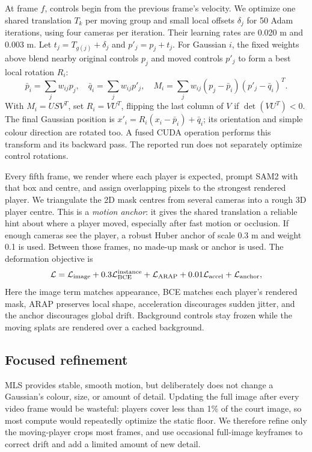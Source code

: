 \documentclass[11pt]{article}
\begin{document}
At frame $f$, controls begin from the previous frame's velocity. We optimize one shared translation
$T_k$ per moving group and small local offsets $\delta_j$ for 50 Adam iterations, using four
cameras per iteration. Their learning rates are 0.020 m and 0.003 m. Let
$t_j=T_{g(j)}+\delta_j$ and $p'_j=p_j+t_j$. For Gaussian $i$, the fixed weights above blend nearby
original controls $p_j$ and moved controls $p'_j$ to form a best local rotation $R_i$:
\[
 \bar p_i=\sum_jw_{ij}p_j,\quad \bar q_i=\sum_jw_{ij}p'_j,\quad
 M_i=\sum_jw_{ij}(p_j-\bar p_i)(p'_j-\bar q_i)^T.
\]
With $M_i=USV^T$, set $R_i=VU^T$, flipping the last column of $V$ if $\det(VU^T)<0$. The final
Gaussian position is $x'_i=R_i(x_i-\bar p_i)+\bar q_i$; its orientation and simple colour direction
are rotated too. A fused CUDA operation performs this transform and its backward pass. The reported
run does not separately optimize control rotations.

Every fifth frame, we render where each player is expected, prompt SAM2 with that box and centre,
and assign overlapping pixels to the strongest rendered player. We triangulate the 2D mask centres
from several cameras into a rough 3D player centre. This is a \emph{motion anchor}: it gives the
shared translation a reliable hint about where a player moved, especially after fast motion or
occlusion. If enough cameras see the player, a robust Huber anchor of scale 0.3 m and weight 0.1
is used. Between those frames, no made-up mask or anchor is used. The deformation objective is
\[
\mathcal L=\mathcal L_{\rm image}+0.3\mathcal L_{\rm BCE}^{\rm instance}
+\mathcal L_{\rm ARAP}+0.01\mathcal L_{\rm accel}+\mathcal L_{\rm anchor},
\]
Here the image term matches appearance, BCE matches each player's rendered mask, ARAP preserves
local shape, acceleration discourages sudden jitter, and the anchor discourages global drift.
Background controls stay frozen while the moving splats are rendered over a cached background.



\subsection{Focused refinement}
MLS provides stable, smooth motion, but deliberately does not change a Gaussian's colour, size, or
amount of detail. Updating the full image after every video frame would be wasteful: players cover
less than 1\% of the court image, so most compute would repeatedly optimize the static floor. We
therefore refine only the moving-player crops most frames, and use occasional full-image keyframes
to correct drift and add a limited amount of new detail.
\end{document}
